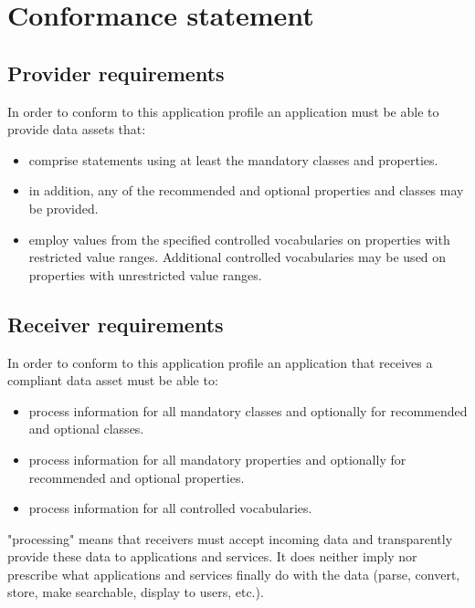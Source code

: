 \section{Conformance statement}
\label{sec:conformance-statement}


\subsection{Provider requirements}
\label{provider-requirements}

In order to conform to this application profile an application must be
able to provide data assets that:

\begin{itemize}
\item
  comprise statements using at least the mandatory classes and
  properties.
\item
  in addition, any of the recommended and optional properties and
  classes may be provided.
\item
  employ values from the specified controlled vocabularies on properties
  with restricted value ranges. Additional controlled vocabularies may
  be used on properties with unrestricted value ranges.
\end{itemize}

\subsection{Receiver requirements}
\label{receiver-requirements}

In order to conform to this application profile an application that
receives a compliant data asset must be able to:

\begin{itemize}
\item
  process information for all mandatory classes and optionally for
  recommended and optional classes.
\item
  process information for all mandatory properties and optionally for
  recommended and optional properties.
\item
  process information for all controlled vocabularies.
\end{itemize}

"processing" means that receivers must accept incoming data and
transparently provide these data to applications and services. It does
neither imply nor prescribe what applications and services finally do
with the data (parse, convert, store, make searchable, display to users,
etc.).
